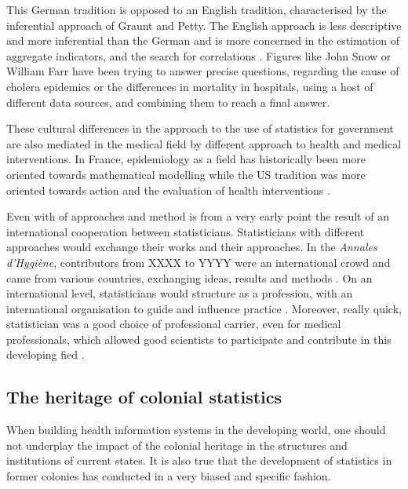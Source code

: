 \documentclass[letterpaper, 10 pt, conference]{IEEEconf}  %
\begin{document}
This German tradition is opposed to an English tradition, characterised by the inferential approach of Graunt and Petty. The English approach is less descriptive and more inferential than the German and is more concerned in the estimation of aggregate indicators, and the search for correlations  \cite{desrosieres_politique_1993}. Figures like John Snow or William Farr have been trying to answer precise questions, regarding the cause of cholera epidemics or the differences in mortality in hospitals, using a host of different data sources, and combining them to reach a final answer.

These cultural differences in the approach to the use of statistics for government are also mediated in the medical field by different approach to health and medical interventions. In France, epidemiology as a field has historically been more oriented towards mathematical modelling while the US tradition was more oriented towards action and the evaluation of health interventions \cite{bergeron_savoirs_2014}.

Even with  of approaches and method is from a very early point the result of an international cooperation between statisticians. Statisticians with different approaches would exchange their works and their approaches. In the \textit{Annales d'Hygiène}, contributors from XXXX to YYYY were an international crowd and came from various countries, exchanging ideas, results and methods \cite{lecuyer_medecins_1977}. On an international level, statisticians would structure as a profession, with an international organisation to guide and influence practice	\cite{desrosieres_politique_1993, desrosieres_administrator_1997}. Moreover, really quick, statistician was a good choice of professional carrier, even for medical professionals, which allowed good scientists to participate and contribute in this developing fied \cite{lecuyer_medecins_1977}.





\subsection{The heritage of colonial statistics}

When building health information systems in the developing world, one should not underplay the impact of the colonial heritage in the structures and institutions of current states. It is also true that the development of statistics in former colonies has conducted in a very biased and specific fashion.
\end{document}
